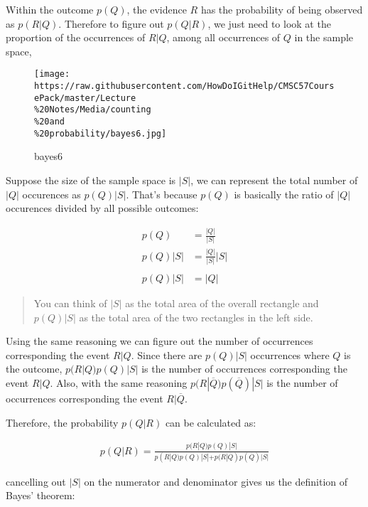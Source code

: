 Within the outcome \textbf{\(p(Q)\)}, the evidence \textbf{\(R\)} has
the probability of being observed as \textbf{\(p(R|Q)\)}. Therefore to
figure out \textbf{\(p(Q|R)\)}, we just need to look at the proportion
of the occurrences of \textbf{\(R|Q\)}, among all occurrences of
\textbf{\(Q\)} in the sample space,

\begin{figure}
\centering
\texttt{[image: https://raw.githubusercontent.com/HowDoIGitHelp/CMSC57CoursePack/master/Lecture\\\%20Notes/Media/counting\\\%20and\\\%20probability/bayes6.jpg]}
\caption{bayes6}
\end{figure}

Suppose the size of the sample space is \textbf{\(|S|\)}, we can
represent the total number of \textbf{\(|Q|\)} occurences as
\textbf{\(p(Q)|S|\)}. That's because \textbf{\(p(Q)\)} is basically the
ratio of \textbf{\(|Q|\)} occurences divided by all possible outcomes:

\[
\begin{aligned}
p(Q)&=\frac{|Q|}{|S|}\\
p(Q)|S|&=\frac{|Q|}{|S|}|S|\\\\
p(Q)|S|&=|Q|
\end{aligned}
\]

\begin{quote}
You can think of \textbf{\(|S|\)} as the total area of the overall
rectangle and \textbf{\(p(Q)|S|\)} as the total area of the two
rectangles in the left side.
\end{quote}

Using the same reasoning we can figure out the number of occurrences
corresponding the event \textbf{\(R|Q\)}. Since there are
\textbf{\(p(Q)|S|\)} occurrences where \textbf{\(Q\)} is the outcome,
\textbf{\(p(R|Q)p(Q)|S|\)} is the number of occurrences corresponding
the event \textbf{\(R|Q\)}. Also, with the same reasoning
\textbf{\(p(R|\overline{Q})p(\overline{Q})|S|\)} is the number of
occurrences corresponding the event \textbf{\(R|\overline{Q}\)}.

Therefore, the probability \textbf{\(p(Q|R)\)} can be calculated as:

\[
\begin{aligned}
p(Q|R)=\frac{p(R|Q)p(Q)|S|}{p(R|Q)p(Q)|S|+p(R|\overline{Q})p(\overline{Q})|S|}
\end{aligned}
\]

cancelling out \textbf{\(|S|\)} on the numerator and denominator gives
us the definition of Bayes' theorem:

